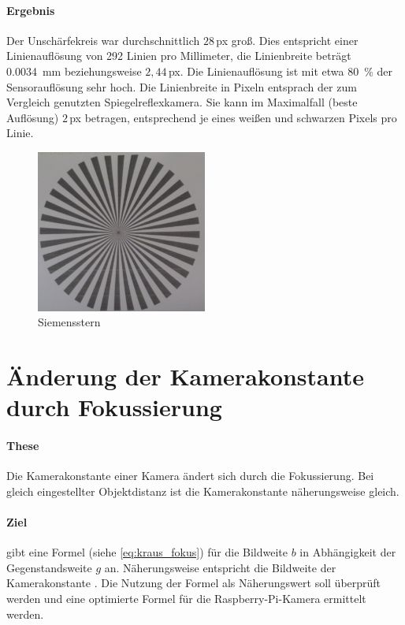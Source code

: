 \documentclass[./00PhotoBox.tex]{subfiles}
\begin{document}
\paragraph{Ergebnis}

Der Unschärfekreis war durchschnittlich $28$\,\gls{px} groß. Dies entspricht einer Linienauflösung von 292 Linien pro Millimeter, die Linienbreite beträgt \SI{0,0034}{\milli\metre} beziehungsweise $2,44$\,\gls{px}. Die Linienauflösung ist mit etwa \SI{80}{\percent} der Sensorauflösung sehr hoch. Die Linienbreite in Pixeln entsprach der zum Vergleich genutzten Spiegelreflexkamera. Sie kann im Maximalfall (beste Auflösung) $2$\,\gls{px} betragen, entsprechend je eines weißen und schwarzen Pixels pro Linie.

\begin{figure}
    \centering
    \includegraphics[width=0.5\textwidth]{./img/siemens.jpg}
    \caption{Siemensstern} %
    \label{img:siemens} %
\end{figure}


\section{Änderung der Kamerakonstante durch Fokussierung}
\label{sec:fokus}

\paragraph{These}
Die \Gls{Kamerakonstante} einer Kamera ändert sich durch die Fokussierung. Bei gleich eingestellter Objektdistanz ist die \Gls{Kamerakonstante} näherungsweise gleich.

\paragraph{Ziel}
\citet[S. 59]{kraus} gibt eine Formel (siehe \autoref{eq:kraus_fokus}) für die \Gls{Bildweite} $b$ in Abhängigkeit der Gegenstandsweite $g$ an. Näherungsweise entspricht die \Gls{Bildweite} der \Gls{Kamerakonstante} \citep[S. 59]{kraus}. Die Nutzung der Formel als Näherungswert soll überprüft werden und eine optimierte Formel für die Raspberry-Pi-Kamera ermittelt werden.
\end{document}
